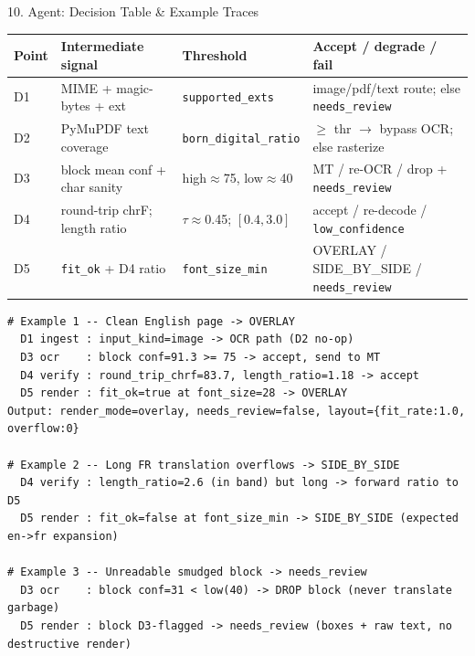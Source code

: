 \documentclass[10pt,aspectratio=169]{beamer}
\begin{document}
\begin{frame}[fragile]{10. Agent: Decision Table \& Example Traces}
\begin{table}[h]
\centering\scriptsize
\setlength{\tabcolsep}{3pt}
\begin{tabular}{llll}
\toprule
\textbf{Point} & \textbf{Intermediate signal} & \textbf{Threshold} & \textbf{Accept / degrade / fail} \\
\midrule
D1 & MIME + magic-bytes + ext & \texttt{supported\_exts} & image/pdf/text route; else \texttt{needs\_review} \\
D2 & PyMuPDF text coverage & \texttt{born\_digital\_ratio} & $\geq$ thr $\rightarrow$ bypass OCR; else rasterize \\
D3 & block mean conf + char sanity & high$\approx$75, low$\approx$40 & MT / re-OCR / drop + \texttt{needs\_review} \\
D4 & round-trip chrF; length ratio & $\tau\approx$0.45; $[0.4,3.0]$ & accept / re-decode / \texttt{low\_confidence} \\
D5 & \texttt{fit\_ok} + D4 ratio & \texttt{font\_size\_min} & OVERLAY / SIDE\_BY\_SIDE / \texttt{needs\_review} \\
\bottomrule
\end{tabular}
\end{table}

\begin{lstlisting}[basicstyle=\ttfamily\tiny]
# Example 1 -- Clean English page -> OVERLAY
  D1 ingest : input_kind=image -> OCR path (D2 no-op)
  D3 ocr    : block conf=91.3 >= 75 -> accept, send to MT
  D4 verify : round_trip_chrf=83.7, length_ratio=1.18 -> accept
  D5 render : fit_ok=true at font_size=28 -> OVERLAY
Output: render_mode=overlay, needs_review=false, layout={fit_rate:1.0, overflow:0}

# Example 2 -- Long FR translation overflows -> SIDE_BY_SIDE
  D4 verify : length_ratio=2.6 (in band) but long -> forward ratio to D5
  D5 render : fit_ok=false at font_size_min -> SIDE_BY_SIDE (expected en->fr expansion)

# Example 3 -- Unreadable smudged block -> needs_review
  D3 ocr    : block conf=31 < low(40) -> DROP block (never translate garbage)
  D5 render : block D3-flagged -> needs_review (boxes + raw text, no destructive render)
\end{lstlisting}
\end{frame}
\end{document}
